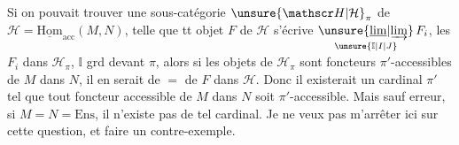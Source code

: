 Si on pouvait trouver une sous-catégorie
$\unsure{\mathscr H|\mathcal H}_\pi$ de $\mathscr H=\underline{\mathrm{Hom}}_{\mathrm{acc}}(M,N)$,  telle que tt
objet $F$ de $\mathscr H$ s'écrive $\underset{\unsure{\mathbb I|I|J}}{\unsure{\underline{\lim}|\underrightarrow{\lim}}}\,F_i$, les
$F_i$ dans $\mathscr H_\pi$, $\mathbb I$ grd devant $\pi$, alors
 si les objets de $\mathscr H_\pi$ sont 
foncteurs $\pi'$-accessibles de $M$ dans $N$\unsure{\}}, 
il en serait de $=$ de  $F$ dans $\mathscr H$.
Donc il existerait un cardinal  $\pi'$
tel que tout foncteur accessible de
$M$ dans $N$ soit $\pi'$-accessible. Mais
sauf erreur, si  $M=N=\mathrm{Ens}$, il n'existe
pas de tel cardinal. Je ne veux
pas m'arrêter ici sur cette question,
et faire un contre-exemple.

